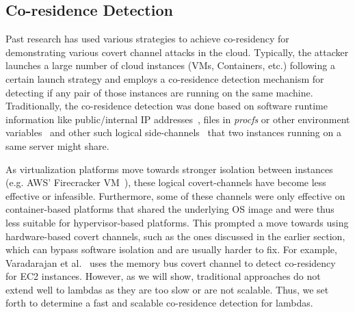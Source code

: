 \subsection{Co-residence Detection}
\label{sec:background:pastwork}

Past research has used various strategies to achieve co-residency for demonstrating 
various covert channel attacks in the cloud. Typically, the attacker launches a 
large number of cloud instances (VMs, Containers, etc.) following a certain 
launch strategy and employs a co-residence detection mechanism for detecting if
any pair of those instances are running on the same machine. 
Traditionally, the co-residence detection was done based on software runtime information 
like public/internal IP addresses~\cite{ristenpartccs2009}, files in \textit{procfs} 
or other environment variables~\cite{wangusenix2018,wuusenix2012} and other such logical
side-channels~\cite{varad191016,vmplacement} that two instances running on a same
server might share.

As virtualization platforms move towards stronger isolation between instances
(e.g. AWS' Firecracker VM~\cite{firecracker}), these logical covert-channels
have become less effective or infeasible. Furthermore, some of these
channels were only effective on container-based platforms that shared the
underlying OS image and were thus less suitable for hypervisor-based platforms.
This prompted a move towards using hardware-based covert channels, such as the 
ones discussed in the earlier section, which can bypass software isolation and 
are usually harder to fix. For example, Varadarajan et al.~\cite{varadarajan2015}
uses the memory bus covert channel to detect co-residency for EC2 instances. 
However, as we will show, traditional approaches do not extend well to lambdas 
as they are too slow or are not scalable. Thus, we set forth to determine a 
fast and scalable co-residence detection for lambdas.